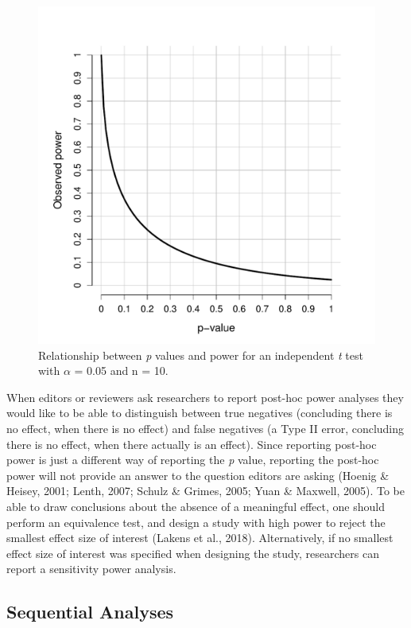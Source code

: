 \documentclass[
  english,
  ,jou, a4paper,floatsintext]{apa6}
\begin{document}
\begin{figure}
\centering
\includegraphics{sample_size_justification_files/figure-latex/obs-power-plot-2-1.pdf}
\caption{\label{fig:obs-power-plot-2}Relationship between \emph{p} values and power for an independent \emph{t} test with \(\alpha\) = 0.05 and n = 10.}
\end{figure}

When editors or reviewers ask researchers to report post-hoc power analyses they would like to be able to distinguish between true negatives (concluding there is no effect, when there is no effect) and false negatives (a Type II error, concluding there is no effect, when there actually is an effect). Since reporting post-hoc power is just a different way of reporting the \emph{p} value, reporting the post-hoc power will not provide an answer to the question editors are asking (Hoenig \& Heisey, 2001; Lenth, 2007; Schulz \& Grimes, 2005; Yuan \& Maxwell, 2005). To be able to draw conclusions about the absence of a meaningful effect, one should perform an equivalence test, and design a study with high power to reject the smallest effect size of interest (Lakens et al., 2018). Alternatively, if no smallest effect size of interest was specified when designing the study, researchers can report a sensitivity power analysis.

\hypertarget{sequential-analyses}{%
\subsection{Sequential Analyses}\label{sequential-analyses}}
\end{document}
